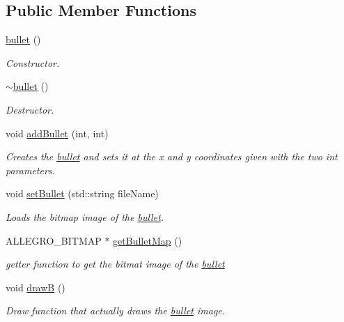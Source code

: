 \subsection*{Public Member Functions}
\begin{DoxyCompactItemize}
\item 
\hyperlink{classbullet_a56eac386b0e6268b746bd7ed4883e1df}{bullet} ()
\begin{DoxyCompactList}\small\item\em Constructor. \item\end{DoxyCompactList}\item 
\hyperlink{classbullet_a82a107fafc86d136e4a78ff13d14ceaf}{$\sim$bullet} ()
\begin{DoxyCompactList}\small\item\em Destructor. \item\end{DoxyCompactList}\item 
void \hyperlink{classbullet_a426140d3b62940f83861048560a570bd}{addBullet} (int, int)
\begin{DoxyCompactList}\small\item\em Creates the \hyperlink{classbullet}{bullet} and sets it at the x and y coordinates given with the two int parameters. \item\end{DoxyCompactList}\item 
void \hyperlink{classbullet_a32b293b38ec5efd19c86c5cc95ab0e25}{setBullet} (std::string fileName)
\begin{DoxyCompactList}\small\item\em Loads the bitmap image of the \hyperlink{classbullet}{bullet}. \item\end{DoxyCompactList}\item 
ALLEGRO\_\-BITMAP $\ast$ \hyperlink{classbullet_a16ea275b798ae9236015b3ff2e8fcb25}{getBulletMap} ()
\begin{DoxyCompactList}\small\item\em getter function to get the bitmat image of the \hyperlink{classbullet}{bullet} \item\end{DoxyCompactList}\item 
void \hyperlink{classbullet_a93cf5a76bb99163b52f5e42a359ea2e8}{drawB} ()
\begin{DoxyCompactList}\small\item\em Draw function that actually draws the \hyperlink{classbullet}{bullet} image. \item\end{DoxyCompactList}\end{DoxyCompactItemize}
